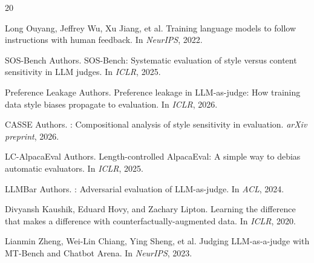 \documentclass[11pt,a4paper]{article}
\begin{document}
\begin{thebibliography}{20}

Long Ouyang, Jeffrey Wu, Xu Jiang, et al.
\newblock Training language models to follow instructions with human feedback.
\newblock In \emph{NeurIPS}, 2022.

{SOS-Bench Authors}.
\newblock SOS-Bench: Systematic evaluation of style versus content sensitivity in {LLM} judges.
\newblock In \emph{ICLR}, 2025.

{Preference Leakage Authors}.
\newblock Preference leakage in {LLM}-as-judge: How training data style biases propagate to evaluation.
\newblock In \emph{ICLR}, 2026.

{CASSE Authors}.
: Compositional analysis of style sensitivity in evaluation.
\newblock \emph{arXiv preprint}, 2026.

{LC-AlpacaEval Authors}.
\newblock Length-controlled {AlpacaEval}: A simple way to debias automatic evaluators.
\newblock In \emph{ICLR}, 2025.

{LLMBar Authors}.
: Adversarial evaluation of {LLM}-as-judge.
\newblock In \emph{ACL}, 2024.

Divyansh Kaushik, Eduard Hovy, and Zachary Lipton.
\newblock Learning the difference that makes a difference with counterfactually-augmented data.
\newblock In \emph{ICLR}, 2020.

Lianmin Zheng, Wei-Lin Chiang, Ying Sheng, et al.
\newblock Judging {LLM}-as-a-judge with {MT-Bench} and {Chatbot Arena}.
\newblock In \emph{NeurIPS}, 2023.

\end{thebibliography}
\end{document}
